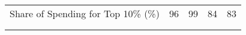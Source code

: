 \begin{tabular}{l cccc}
Share of Spending for Top 10\% (\%) & 96 & 99 & 84 & 83 \\

\vspace{-0.7pt} & \vspace{-0.7pt} & \vspace{-0.7pt} & \vspace{-0.7pt} & \vspace{-0.7pt} \\ \hline 

\vspace{-1.5pt} & \vspace{-1.5pt} & \vspace{-1.5pt} & \vspace{-1.5pt} & \vspace{-1.5pt} \\


\end{tabular}


